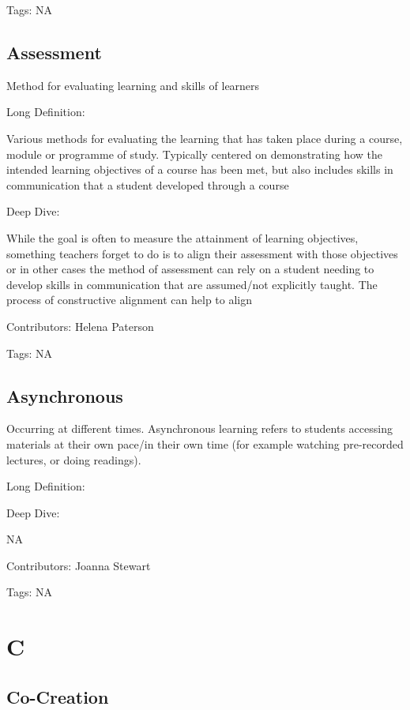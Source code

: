 \documentclass[
  letterpaper,
  DIV=11,
  numbers=noendperiod]{scrreprt}
\begin{document}
Tags: NA

\section{Assessment}\label{assessment}

Method for evaluating learning and skills of learners

Long Definition:

Various methods for evaluating the learning that has taken place during
a course, module or programme of study. Typically centered on
demonstrating how the intended learning objectives of a course has been
met, but also includes skills in communication that a student developed
through a course

Deep Dive:

While the goal is often to measure the attainment of learning
objectives, something teachers forget to do is to align their assessment
with those objectives or in other cases the method of assessment can
rely on a student needing to develop skills in communication that are
assumed/not explicitly taught. The process of constructive alignment can
help to align

Contributors: Helena Paterson

Tags: NA

\section{Asynchronous}\label{asynchronous}

Occurring at different times. Asynchronous learning refers to students
accessing materials at their own pace/in their own time (for example
watching pre-recorded lectures, or doing readings).

Long Definition:

Deep Dive:

NA

Contributors: Joanna Stewart

Tags: NA


\chapter{C}\label{c}

\section{Co-Creation}\label{co-creation}
\end{document}
